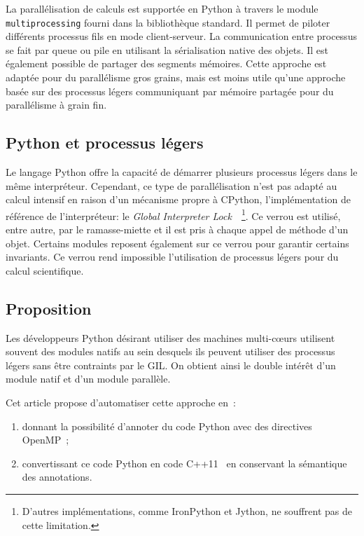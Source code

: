 \documentclass[renpar]{compas2013}
\begin{document}
La parallélisation de calculs est supportée en Python à travers le module
\texttt{multiprocessing} fourni dans la bibliothèque standard.  Il permet
de piloter différents processus fils en mode client-serveur. La
communication entre processus se fait par queue ou pile en utilisant la
sérialisation native des objets. Il est également possible de partager des
segments mémoires. Cette approche est adaptée pour du parallélisme gros
grains, mais est moins utile qu'une approche basée sur des processus
légers communiquant par mémoire partagée pour du parallélisme à grain fin.

\subsection{Python et processus légers}

Le langage Python offre la capacité de démarrer plusieurs processus légers
dans le même interpréteur. Cependant, ce type de parallélisation n'est pas
adapté au calcul intensif en raison d'un mécanisme propre à CPython,
l'implémentation de référence de l'interpréteur: le \emph{Global
Interpreter Lock}~\cite{gil2012}~\footnote{D'autres implémentations, comme
IronPython et Jython, ne souffrent pas de cette limitation.}. Ce verrou
est utilisé, entre autre, par le ramasse-miette et il est pris à chaque
appel de méthode d'un objet.  Certains modules reposent également sur ce
verrou pour garantir certains invariants. Ce verrou rend impossible
l'utilisation de processus légers pour du calcul scientifique.

\subsection{Proposition}

Les développeurs Python désirant utiliser des machines multi-cœurs
utilisent souvent des modules natifs au sein desquels ils peuvent utiliser
des processus légers sans être contraints par le GIL. On obtient ainsi le
double intérêt d'un module natif et d'un module parallèle.

Cet article propose d'automatiser cette approche en~:
\begin{enumerate}
  \item donnant la possibilité d'annoter du code Python avec des
	directives OpenMP~\cite{openmp3.1};
  \item convertissant ce code Python en code C++11~\cite{isocxx11} en conservant la
	sémantique des annotations.
\end{enumerate}
\end{document}

